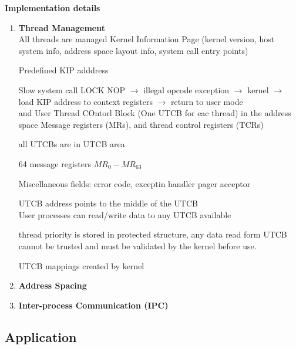 \documentclass{article}
\begin{document}
    \textbf{Implementation details}
    \begin{enumerate}[1., leftmargin = 0.7cm, nosep]
    \item \textbf{Thread Management}\\
        All threads are managed 
        Kernel Information Page (kernel version, host system info, address space layout
        info, system call entry points)
        
        Predefined KIP adddress

        Slow system call LOCK NOP $\rightarrow$ illegal opcode exception $\rightarrow$ kernel $\rightarrow$ load KIP address
        to context registers $\rightarrow$ return to user mode
        \\ 
        and User Thread COntorl Block (One UTCB for eac thread) in the address space
         Message registers (MRs), and thread control registers (TCRs) 

         all UTCBs are in UTCB area

         64 message registers $MR_0 - MR_63$

         Miscellaneous fields: error code, exceptin handler pager acceptor
         
         UTCB address  points to the middle of the UTCB \\

         User processes can read/write data to any UTCB available

         thread priority is stored in protected structure, any data read form UTCB cannot be
         trusted and must  be validated by the kernel before use.

         UTCB mappings created by kernel

     \item \textbf{Address Spacing}

     \item \textbf{Inter-process Communication (IPC)}



    \end{enumerate}


    \pagebreak

    \subsection{Application}
    
\end{document}
